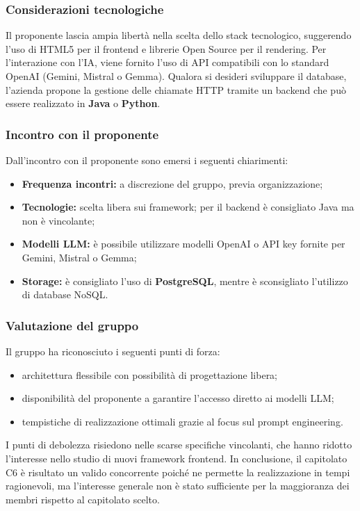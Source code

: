 \documentclass[a4paper,12pt]{article}
\begin{document}
\subsubsection{Considerazioni tecnologiche}

Il proponente lascia ampia libertà nella scelta dello stack tecnologico, suggerendo l'uso di HTML5 per il frontend e librerie Open Source per il rendering. Per l'interazione con l'IA, viene fornito l'uso di API compatibili con lo standard OpenAI (Gemini, Mistral o Gemma). Qualora si desideri sviluppare il database, l'azienda propone la gestione delle chiamate HTTP tramite un backend che può essere realizzato in \textbf{Java} o \textbf{Python}.

\subsubsection{Incontro con il proponente}

Dall'incontro con il proponente sono emersi i seguenti chiarimenti:
\begin{itemize}
    \item \textbf{Frequenza incontri:} a discrezione del gruppo, previa organizzazione;
    \item \textbf{Tecnologie:} scelta libera sui framework; per il backend è consigliato Java ma non è vincolante;
    \item \textbf{Modelli LLM:} è possibile utilizzare modelli OpenAI o API key fornite per Gemini, Mistral o Gemma;
    \item \textbf{Storage:} è consigliato l'uso di \textbf{PostgreSQL}, mentre è sconsigliato l'utilizzo di database NoSQL.
\end{itemize}

\subsubsection{Valutazione del gruppo}

Il gruppo ha riconosciuto i seguenti punti di forza:
\begin{itemize}
    \item architettura flessibile con possibilità di progettazione libera;
    \item disponibilità del proponente a garantire l'accesso diretto ai modelli LLM;
    \item tempistiche di realizzazione ottimali grazie al focus sul prompt engineering.
\end{itemize}

I punti di debolezza risiedono nelle scarse specifiche vincolanti, che hanno ridotto l'interesse nello studio di nuovi framework frontend. In conclusione, il capitolato C6 è risultato un valido concorrente poiché ne permette la realizzazione in tempi ragionevoli, ma l’interesse generale non è stato sufficiente per la maggioranza dei membri rispetto al capitolato scelto.
\end{document}
